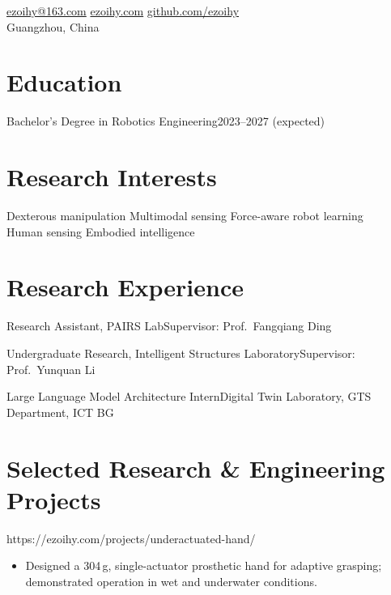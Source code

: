 \documentclass[a4paper,11pt]{article}
\begin{document}
\begin{center}
  \small
  \href{mailto:ezoihy@163.com}{ezoihy@163.com}
  \enspace\textbar\enspace
  \href{https://ezoihy.com}{ezoihy.com}
  \enspace\textbar\enspace
  \href{https://github.com/ezoihy}{github.com/ezoihy}\\[2pt]
  Guangzhou, China
\end{center}
\vspace{-8pt}

\section*{Education}
{Bachelor's Degree in Robotics Engineering}{2023--2027 (expected)}

\section*{Research Interests}
Dexterous manipulation \enspace\textperiodcentered\enspace
Multimodal sensing \enspace\textperiodcentered\enspace Force-aware robot learning\\
Human sensing \enspace\textperiodcentered\enspace Embodied intelligence

\section*{Research Experience}
{Research Assistant, PAIRS Lab}{Supervisor: Prof.\ Fangqiang Ding}

{Undergraduate Research, Intelligent Structures Laboratory}{Supervisor: Prof.\ Yunquan Li}

{Large Language Model Architecture Intern}{Digital Twin Laboratory, GTS Department, ICT BG}

\section*{Selected Research \& Engineering Projects}

{https://ezoihy.com/projects/underactuated-hand/}
\begin{itemize}
  \item Designed a 304\,g, single-actuator prosthetic hand for adaptive grasping; demonstrated operation in wet and underwater conditions.
\end{itemize}
\end{document}
